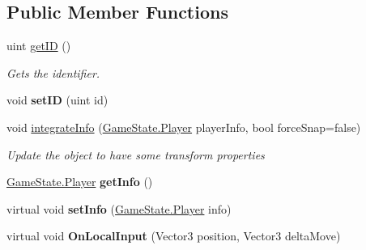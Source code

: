 \subsection*{Public Member Functions}
\begin{DoxyCompactItemize}
\item 
uint \hyperlink{class_player_reference_ae724ca461dddeed2f9671f9a745da381}{get\-I\-D} ()
\begin{DoxyCompactList}\small\item\em Gets the identifier. \end{DoxyCompactList}\item 
\hypertarget{class_player_reference_ae35eca907ad8238c4d51d65d8c021f26}{void {\bfseries set\-I\-D} (uint id)}\label{class_player_reference_ae35eca907ad8238c4d51d65d8c021f26}

\item 
void \hyperlink{class_player_reference_a4918fec4590780ff599dec4a5035bbbe}{integrate\-Info} (\hyperlink{class_game_state_1_1_player}{Game\-State.\-Player} player\-Info, bool force\-Snap=false)
\begin{DoxyCompactList}\small\item\em Update the object to have some transform properties \end{DoxyCompactList}\item 
\hypertarget{class_player_reference_ab6b15f671b1553537a50db3529a74127}{\hyperlink{class_game_state_1_1_player}{Game\-State.\-Player} {\bfseries get\-Info} ()}\label{class_player_reference_ab6b15f671b1553537a50db3529a74127}

\item 
\hypertarget{class_player_reference_aee764d4fed2e9c45ecdcfbf525bd03ed}{virtual void {\bfseries set\-Info} (\hyperlink{class_game_state_1_1_player}{Game\-State.\-Player} info)}\label{class_player_reference_aee764d4fed2e9c45ecdcfbf525bd03ed}

\item 
\hypertarget{class_player_reference_aa8c16ecb182a8b2420158d87bdcdb510}{virtual void {\bfseries On\-Local\-Input} (Vector3 position, Vector3 delta\-Move)}\label{class_player_reference_aa8c16ecb182a8b2420158d87bdcdb510}

\end{DoxyCompactItemize}
